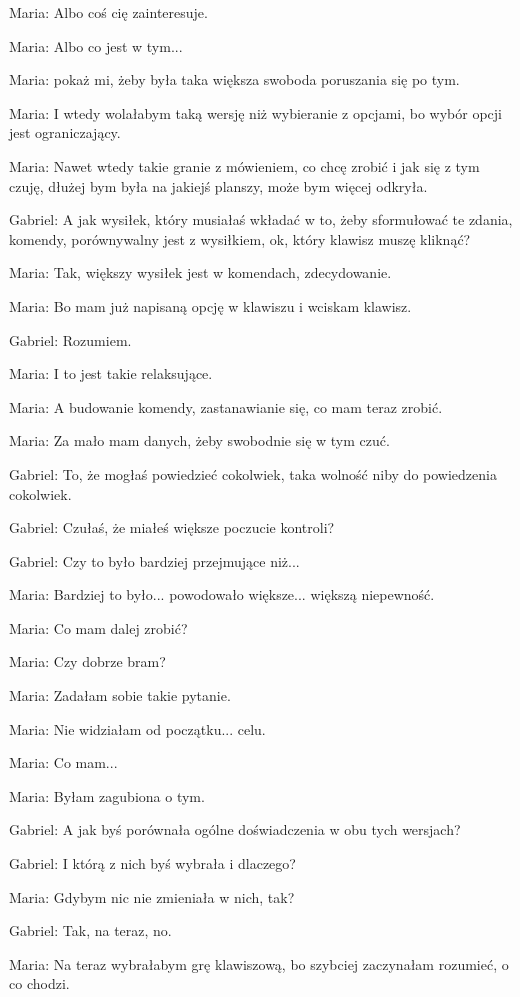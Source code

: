 Maria: Albo coś cię zainteresuje.

Maria: Albo co jest w tym...

Maria: pokaż mi, żeby była taka większa swoboda poruszania się po tym.

Maria: I wtedy wolałabym taką wersję niż wybieranie z opcjami, bo wybór opcji jest ograniczający.

Maria: Nawet wtedy takie granie z mówieniem, co chcę zrobić i jak się z tym czuję, dłużej bym była na jakiejś planszy, może bym więcej odkryła.

Gabriel: A jak wysiłek, który musiałaś wkładać w to, żeby sformułować te zdania, komendy, porównywalny jest z wysiłkiem, ok, który klawisz muszę kliknąć?

Maria: Tak, większy wysiłek jest w komendach, zdecydowanie.

Maria: Bo mam już napisaną opcję w klawiszu i wciskam klawisz.

Gabriel: Rozumiem.

Maria: I to jest takie relaksujące.

Maria: A budowanie komendy, zastanawianie się, co mam teraz zrobić.

Maria: Za mało mam danych, żeby swobodnie się w tym czuć.

Gabriel: To, że mogłaś powiedzieć cokolwiek, taka wolność niby do powiedzenia cokolwiek.

Gabriel: Czułaś, że miałeś większe poczucie kontroli?

Gabriel: Czy to było bardziej przejmujące niż...

Maria: Bardziej to było... powodowało większe... większą niepewność.

Maria: Co mam dalej zrobić?

Maria: Czy dobrze bram?

Maria: Zadałam sobie takie pytanie.

Maria: Nie widziałam od początku... celu.

Maria: Co mam...

Maria: Byłam zagubiona o tym.

Gabriel: A jak byś porównała ogólne doświadczenia w obu tych wersjach?

Gabriel: I którą z nich byś wybrała i dlaczego?

Maria: Gdybym nic nie zmieniała w nich, tak?

Gabriel: Tak, na teraz, no.

Maria: Na teraz wybrałabym grę klawiszową, bo szybciej zaczynałam rozumieć, o co chodzi.

